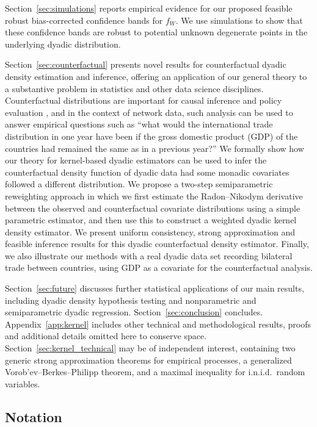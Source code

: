 Section~\ref{sec:simulations} reports empirical evidence for our proposed
feasible robust bias-corrected confidence bands for $f_W$. We use simulations
to show that these confidence bands are robust to potential unknown degenerate
points in the underlying dyadic distribution.

Section~\ref{sec:counterfactual} presents novel results for counterfactual
dyadic density estimation and inference, offering an application of our general
theory to a substantive problem in statistics and other data science
disciplines. Counterfactual distributions are important for causal inference
and policy evaluation
\citep{dinardo1996distribution,chernozhukov2013inference}, and in the context
of network data, such analysis can be used to answer empirical questions such
as ``what would the international trade distribution in one year have been if
the gross domestic product (GDP) of the countries had remained the same as in a
previous year?'' We formally show how our theory for kernel-based dyadic
estimators can be used to infer the counterfactual density function of dyadic
data had some monadic covariates followed a different distribution. We propose
a two-step semiparametric reweighting approach in which we first estimate the
Radon--Nikodym derivative between the observed and counterfactual covariate
distributions using a simple parametric estimator, and then use this to
construct a weighted dyadic kernel density estimator. We present uniform
consistency, strong approximation and feasible inference results for this
dyadic counterfactual density estimator. Finally, we also illustrate our
methods with a real dyadic data set recording bilateral trade between
countries, using GDP as a covariate for the counterfactual analysis.

Section~\ref{sec:future} discusses further statistical applications of our main
results, including dyadic density hypothesis testing and nonparametric and
semiparametric dyadic regression. Section~\ref{sec:conclusion} concludes.
Appendix~\ref{app:kernel} includes other technical and methodological results,
proofs and additional details omitted here to conserve space.
Section~\ref{sec:kernel_technical} may be of independent interest, containing
two generic strong approximation theorems for empirical processes, a
generalized Vorob'ev--Berkes--Philipp theorem, and a maximal inequality for
i.n.i.d.\ random variables.

\subsection{Notation}

